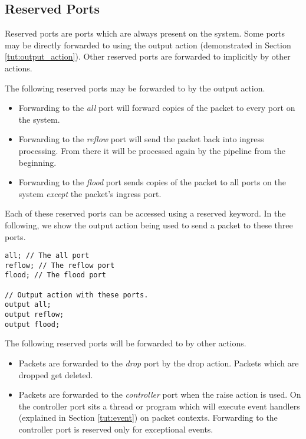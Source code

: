 \subsection {Reserved Ports} \label{tut:reserved_ports}

Reserved ports are ports which are always present on the system. Some ports may be directly forwarded to using the output action (demonstrated in Section \ref{tut:output_action}). Other reserved ports are forwarded to implicitly by other actions.

The following reserved ports may be forwarded to by the output action.

\begin{itemize}
\item Forwarding to the \textit{all} port will forward copies of the packet to every port on the system.

\item Forwarding to the \textit{reflow} port will send the packet back into ingress processing. From there it will be processed again by the pipeline from the beginning.

\item Forwarding to the \textit{flood} port sends copies of the packet to all ports on the system \textit{except} the packet's ingress port.
\end{itemize}

Each of these reserved ports can be accessed using a reserved keyword. In the following, we show the output action being used to send a packet to these three ports.

\begin{codepage}
\begin{lstlisting}
all; // The all port
reflow; // The reflow port
flood; // The flood port

// Output action with these ports.
output all;
output reflow;
output flood;
\end{lstlisting}
\end{codepage}

The following reserved ports will be forwarded to by other actions.

\begin{itemize}
\item Packets are forwarded to the \textit{drop} port by the drop action. Packets which are dropped get deleted.

\item Packets are forwarded to the \textit{controller} port when the raise action is used. On the controller port sits a thread or program which will execute event handlers (explained in Section \ref{tut:event}) on packet contexts. Forwarding to the controller port is reserved only for exceptional events.
\end{itemize}

